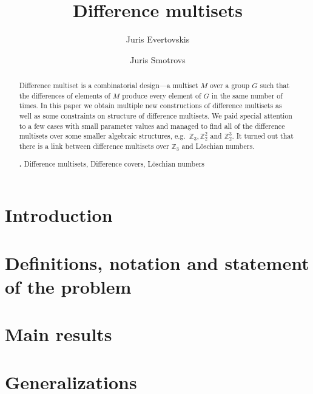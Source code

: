\documentclass{amsart}
\theoremstyle{plain}
\theoremstyle{definition}
\theoremstyle{remark}
\begin{document}
	\title{Difference multisets}

	\author{Juris Evertovskis}

	\author{Juris Smotrovs}
	
	\address{Faculty of Computing, University of Latvia}

	\begin{abstract}
		Difference multiset is a combinatorial design---a multiset $M$ over a 
		group $G$ such that the differences of elements of $M$ produce every 
		element of $G$ in the same number of times. In this paper we obtain 
		multiple new constructions of difference multisets as well as some 
		constraints on structure of difference multisets. We paid special 
		attention to a few cases with small parameter values and managed to 
		find all of the difference multisets over some smaller algebraic 
		structures, e.g.\ $\mathbb Z_3, \mathbb Z_2^2$ and $\mathbb Z_2^3$. 
		It turned out that there is a link between difference multisets over 
		$\mathbb Z_3$ and Löschian numbers.

		\smallskip
		\noindent \textbf{\keywordsname.} Difference multisets, Difference covers, Löschian numbers
	\end{abstract}

	\maketitle
    
    \section{Introduction}
    
     
	\section{Definitions, notation and statement of the problem}
    
	
    \section{Main results}
    
	
    \section{Generalizations}
    
\end{document}
